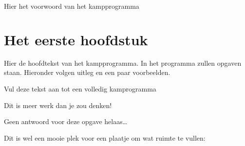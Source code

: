 \documentclass{kampprogramma}
\begin{document}
\voorpagina

\voorwoord
Hier het voorwoord van het kampprogramma

%
%
%

\legenda


\inhoudsopgave


\chapter{Het eerste hoofdstuk}
Hier de hoofdtekst van het kampprogramma. In het programma zullen opgaven
staan. Hieronder volgen uitleg en een paar voorbeelden.

%
%

\begin{opgave}[\ster\vinger\schaar\gr]
Vul deze tekst aan tot een volledig kamprogramma
\begin{hint}
Dit is meer werk dan je zou denken!
\end{hint}
\begin{antwoord}
Geen antwoord voor deze opgave helaas\ldots
\end{antwoord}
\end{opgave}

Dit is wel een mooie plek voor een plaatje om wat ruimte te vullen:
\end{document}
